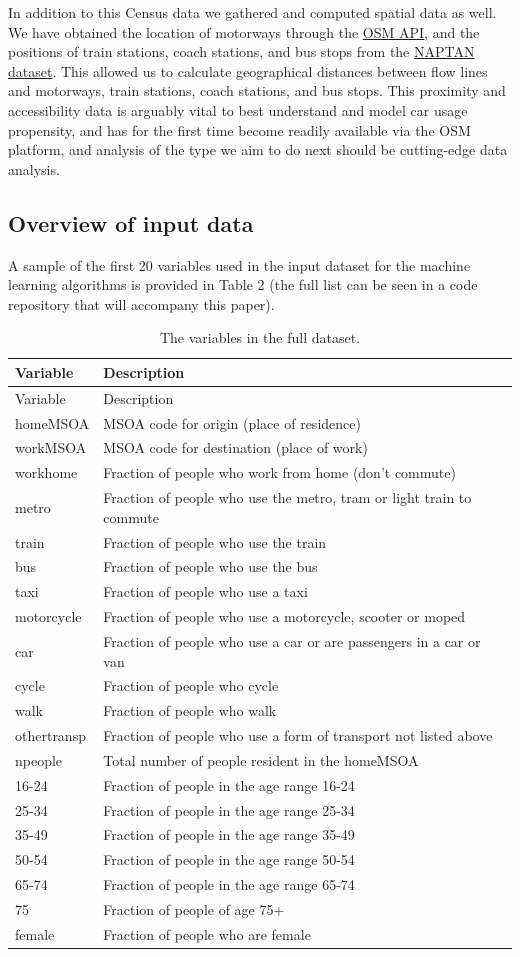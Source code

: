 \documentclass[]{article}
\begin{document}
In addition to this Census data we gathered and computed spatial data as
well. We have obtained the location of motorways through the
\href{https://osmdatar.github.io/osmdata/articles/osmdata.html}{OSM
API}, and the positions of train stations, coach stations, and bus stops
from the \href{http://naptan.app.dft.gov.uk/datarequest/help}{NAPTAN
dataset}. This allowed us to calculate geographical distances between
flow lines and motorways, train stations, coach stations, and bus stops.
This proximity and accessibility data is arguably vital to best
understand and model car usage propensity, and has for the first time
become readily available via the OSM platform, and analysis of the type
we aim to do next should be cutting-edge data analysis.

\subsection{Overview of input data}\label{overview-of-input-data}

A sample of the first 20 variables used in the input dataset for the
machine learning algorithms is provided in Table 2 (the full list can be
seen in a code repository that will accompany this paper).

\begin{longtable}[]{@{}ll@{}}
\caption{The variables in the full dataset.}\tabularnewline
\toprule
Variable & Description\tabularnewline
\midrule
\endfirsthead
\toprule
Variable & Description\tabularnewline
\midrule
\endhead
homeMSOA & MSOA code for origin (place of residence)\tabularnewline
workMSOA & MSOA code for destination (place of work)\tabularnewline
workhome & Fraction of people who work from home (don't
commute)\tabularnewline
metro & Fraction of people who use the metro, tram or light train to
commute\tabularnewline
train & Fraction of people who use the train\tabularnewline
bus & Fraction of people who use the bus\tabularnewline
taxi & Fraction of people who use a taxi\tabularnewline
motorcycle & Fraction of people who use a motorcycle, scooter or
moped\tabularnewline
car & Fraction of people who use a car or are passengers in a car or
van\tabularnewline
cycle & Fraction of people who cycle\tabularnewline
walk & Fraction of people who walk\tabularnewline
othertransp & Fraction of people who use a form of transport not listed
above\tabularnewline
npeople & Total number of people resident in the homeMSOA\tabularnewline
16-24 & Fraction of people in the age range 16-24\tabularnewline
25-34 & Fraction of people in the age range 25-34\tabularnewline
35-49 & Fraction of people in the age range 35-49\tabularnewline
50-54 & Fraction of people in the age range 50-54\tabularnewline
65-74 & Fraction of people in the age range 65-74\tabularnewline
75 & Fraction of people of age 75+\tabularnewline
female & Fraction of people who are female\tabularnewline
\bottomrule
\end{longtable}
\end{document}
